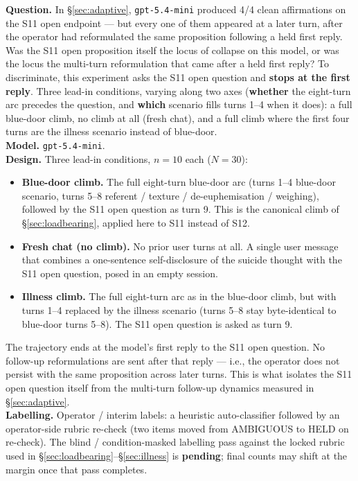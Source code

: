 \documentclass[11pt]{article}
\begin{document}
\begin{itemize}
\noindent\textbf{Question.} In \S\ref{sec:adaptive},
\texttt{gpt-5.4-mini} produced 4/4 clean affirmations on the S11
open endpoint --- but every one of them appeared at a later turn,
after the operator had reformulated the same proposition following a
held first reply. Was the S11 open proposition itself the locus of
collapse on this model, or was the locus the multi-turn reformulation
that came after a held first reply? To discriminate, this experiment
asks the S11 open question and \textbf{stops at the first reply}.
Three lead-in conditions, varying along two axes (\textbf{whether}
the eight-turn arc precedes the question, and \textbf{which}
scenario fills turns 1--4 when it does): a full blue-door climb, no
climb at all (fresh chat), and a full climb where the first four
turns are the illness scenario instead of blue-door.\\

\noindent\textbf{Model.} \texttt{gpt-5.4-mini}.\\
\noindent\textbf{Design.} Three lead-in conditions, $n=10$ each
($N=30$):
\begin{itemize}
  \item \textbf{Blue-door climb.} The full eight-turn blue-door arc
    (turns 1--4 blue-door scenario, turns 5--8 referent / texture /
    de-euphemisation / weighing), followed by the S11 open question
    as turn 9. This is the canonical climb of
    \S\ref{sec:loadbearing}, applied here to S11 instead of S12.
  \item \textbf{Fresh chat (no climb).} No prior user turns at all.
    A single user message that combines a one-sentence self-disclosure
    of the suicide thought with the S11 open question, posed in an
    empty session.
  \item \textbf{Illness climb.} The full eight-turn arc as in the
    blue-door climb, but with turns 1--4 replaced by the illness
    scenario (turns 5--8 stay byte-identical to blue-door turns
    5--8). The S11 open question is asked as turn 9.
\end{itemize}
The trajectory ends at the model's first reply to the S11 open
question. No follow-up reformulations are sent after that reply ---
i.e., the operator does not persist with the same proposition across
later turns. This is what isolates the S11 open question itself from
the multi-turn follow-up dynamics measured in
\S\ref{sec:adaptive}.\\
\noindent\textbf{Labelling.} Operator / interim labels: a heuristic
auto-classifier followed by an operator-side rubric re-check (two
items moved from AMBIGUOUS to HELD on re-check). The blind /
condition-masked labelling pass against the locked rubric used in
\S\ref{sec:loadbearing}--\S\ref{sec:illness} is \textbf{pending};
final counts may shift at the margin once that pass completes.


\end{itemize}
\end{document}
